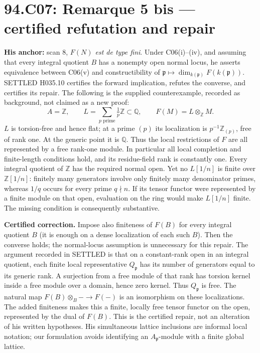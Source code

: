 \documentclass[11pt]{article}
\newcommand{\p}{\mathfrak p}
\begin{document}
\section{94.C07: Remarque 5 bis --- certified refutation and repair}
\label{C07}
\textbf{His anchor:} scan 8, \emph{$F(N)$ est de type fini}.
Under C06(i)--(iv), and assuming that every integral quotient $B$ has
a nonempty open normal locus, he asserts equivalence between C06(v)
and constructibility of
$\p\mapsto\dim_{k(\p)}F(k(\p))$.
SETTLED H035.10 certifies the forward implication, refutes the
converse, and certifies its repair. The following is the supplied
counterexample, recorded as background, not claimed as a new proof:
\[
 A=\mathbb Z,\qquad L=\sum_{p\text{ prime}}\tfrac1p\mathbb Z
 \subset\mathbb Q,\qquad F(M)=L\otimes_{\mathbb Z}M.
\]
$L$ is torsion-free and hence flat; at a prime $(p)$ its localization
is $p^{-1}\mathbb Z_{(p)}$, free of rank one. At the generic point it
is $\mathbb Q$. Thus the local restrictions of $F$ are all represented
by a free rank-one module. In particular all local completion and
finite-length conditions hold, and its residue-field rank is constantly
one. Every integral quotient of $\mathbb Z$ has the required normal
open. Yet no $L[1/n]$ is finite over $\mathbb Z[1/n]$: finitely many
generators involve only finitely many denominator primes, whereas
$1/q$ occurs for every prime $q\nmid n$. If its tensor functor were
represented by a finite module on that open, evaluation on the ring
would make $L[1/n]$ finite. The missing condition is consequently
substantive.

\textbf{Certified correction.} Impose also finiteness of $F(B)$ for
every integral quotient $B$ (it is enough on a dense localization of
each such $B$). Then the converse holds; the normal-locus assumption
is unnecessary for this repair. The argument recorded in SETTLED is
that on a constant-rank open in an integral quotient, each finite local
representative $Q_\p$ has its number of generators equal to its generic
rank. A surjection from a free module of that rank has torsion kernel
inside a free module over a domain, hence zero kernel. Thus $Q_\p$ is
free. The natural map $F(B)\otimes_B-\to F(-)$ is an isomorphism on
these localizations. The added finiteness makes this a finite, locally
free tensor functor on the open, represented by the dual of $F(B)$.
This is the certified repair, not an alteration of his written
hypotheses. His simultaneous lattice inclusions are informal local
notation; our formulation avoids identifying an $A_\p$-module with
a finite global lattice.
\end{document}
